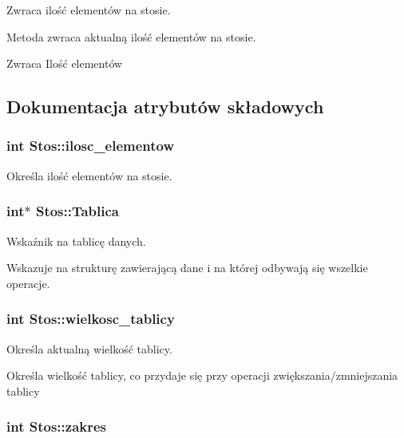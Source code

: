 \-Zwraca ilość elementów na stosie. 

\-Metoda zwraca aktualną ilość elementów na stosie.

\begin{DoxyReturn}{\-Zwraca}
\-Ilość elementów 
\end{DoxyReturn}


\subsection{\-Dokumentacja atrybutów składowych}
\hypertarget{class_stos_a4dd9a9223af0b20cf7582c5ff5dab24a}{
\subsubsection[{ilosc\-\_\-elementow}]{\setlength{\rightskip}{0pt plus 5cm}int {\bf \-Stos\-::ilosc\-\_\-elementow}}}\label{class_stos_a4dd9a9223af0b20cf7582c5ff5dab24a}
\-Określa ilość elementów na stosie. \hypertarget{class_stos_a75e8a31e075c93a0275d069842297081}{
\subsubsection[{\-Tablica}]{\setlength{\rightskip}{0pt plus 5cm}int$\ast$ {\bf \-Stos\-::\-Tablica}}}\label{class_stos_a75e8a31e075c93a0275d069842297081}


\-Wskaźnik na tablicę danych. 

\-Wskazuje na strukturę zawierającą dane i na której odbywają się wszelkie operacje. \hypertarget{class_stos_a223beb5a43eaa0a71df29d0043b92bf3}{
\subsubsection[{wielkosc\-\_\-tablicy}]{\setlength{\rightskip}{0pt plus 5cm}int {\bf \-Stos\-::wielkosc\-\_\-tablicy}}}\label{class_stos_a223beb5a43eaa0a71df29d0043b92bf3}


\-Określa aktualną wielkość tablicy. 

\-Określa wielkość tablicy, co przydaje się przy operacji zwiększania/zmniejszania tablicy \hypertarget{class_stos_aa1acdee575ff6bd5fcd2778b2c0fd2df}{
\subsubsection[{zakres}]{\setlength{\rightskip}{0pt plus 5cm}int {\bf \-Stos\-::zakres}}}\label{class_stos_aa1acdee575ff6bd5fcd2778b2c0fd2df}


